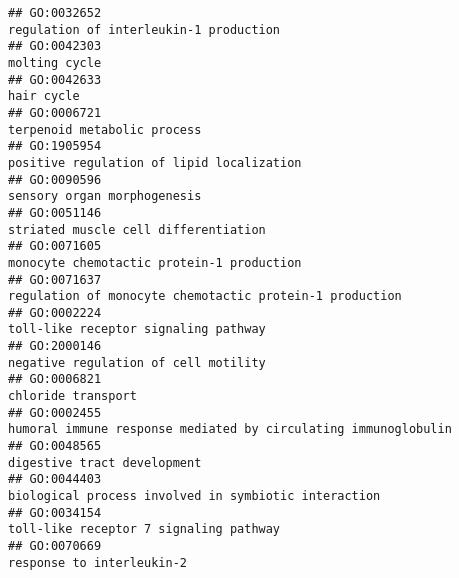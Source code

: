 \documentclass[
]{article}
\begin{document}
\begin{verbatim}
## GO:0032652                                                                                                           regulation of interleukin-1 production
## GO:0042303                                                                                                                                    molting cycle
## GO:0042633                                                                                                                                       hair cycle
## GO:0006721                                                                                                                      terpenoid metabolic process
## GO:1905954                                                                                                        positive regulation of lipid localization
## GO:0090596                                                                                                                      sensory organ morphogenesis
## GO:0051146                                                                                                             striated muscle cell differentiation
## GO:0071605                                                                                                        monocyte chemotactic protein-1 production
## GO:0071637                                                                                          regulation of monocyte chemotactic protein-1 production
## GO:0002224                                                                                                             toll-like receptor signaling pathway
## GO:2000146                                                                                                             negative regulation of cell motility
## GO:0006821                                                                                                                               chloride transport
## GO:0002455                                                                                   humoral immune response mediated by circulating immunoglobulin
## GO:0048565                                                                                                                      digestive tract development
## GO:0044403                                                                                             biological process involved in symbiotic interaction
## GO:0034154                                                                                                           toll-like receptor 7 signaling pathway
## GO:0070669                                                                                                                        response to interleukin-2

\end{verbatim}
\end{document}
